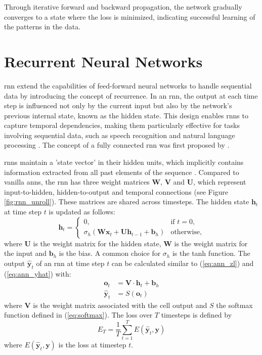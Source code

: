 \documentclass[12pt, a4paper, headinclude, twoside, plainheadsepline, open=right, numbers=noenddot, hidelinks, toc=listof, toc=bibliography]{scrreprt}
\begin{document}
Through iterative forward and backward propagation, the network gradually converges to a state where the loss is minimized, indicating successful learning of the patterns in the data.

\section{Recurrent Neural Networks}
\label{sec:rnn}

\Ac{rnn} extend the capabilities of feed-forward neural networks to handle sequential data by introducing the concept of recurrence. 
In an \ac{rnn}, the output at each time step is influenced not only by the current input but also by the network's previous internal state, known as the hidden state. 
This design enables \acp{rnn} to capture temporal dependencies, making them particularly effective for tasks involving sequential data, such as speech recognition and natural language processing \cite{lecunDeepLearning2015}.
The concept of a fully connected \ac{rnn} was first proposed by \citeauthor{elmanFindingStructureTime1990} \cite{elmanFindingStructureTime1990}.

\Acp{rnn} maintain a 'state vector' in their hidden units, which implicitly contains information extracted from all past elements of the sequence \cite{lecunDeepLearning2015}.
Compared to vanilla \acp{ann}, the \ac{rnn} has three weight matrices $\mathbf{W}$, $\mathbf{V}$ and $\mathbf{U}$, which represent input-to-hidden, hidden-to-output and temporal connections (see Figure \ref{fig:rnn_unroll}).
These matrices are shared across timesteps.
The hidden state $\mathbf{h}_t$ at time step $t$ is updated as follows:
\begin{equation}
\label{eq:rnn_update} 
\mathbf{h}_t =
\begin{cases}
	0, & \text{if } t = 0, \\
	\sigma_h (\mathbf{W} \mathbf{x}_t + \mathbf{U} \mathbf{h}_{t-1} + \mathbf{b}_h)
	& \text{otherwise},
\end{cases}
\end{equation}
where $\mathbf{U}$ is the weight matrix for the hidden state, $\mathbf{W}$ is the weight matrix for the input and $\mathbf{b}_h$ is the bias.
A common choice for $\sigma_h$ is the tanh function.
The output $\mathbf{\hat{y}}_t$ of an \ac{rnn} at time step $t$ can be calculated similar to (\ref{eq:ann_zl}) and (\ref{eq:ann_yhat}) with:
\begin{equation}
\label{eq:rnn_output}
\begin{split}
\mathbf{o}_t &= \mathbf{V} \cdot \mathbf{h}_t + \mathbf{b}_h \\
\mathbf{\hat{y}}_t &= S(\mathbf{o}_t)
\end{split}
\end{equation}
where $\mathbf{V}$ is the weight matrix associated with the cell output and $S$ the softmax function defined in (\ref{eq:softmax}). 
The loss over $T$ timesteps is defined by 
\begin{equation}
E_T = \frac{1}{T} \sum_{t=1}^{T} {E(\mathbf{\hat{y}}_t, \mathbf{y})}
\end{equation} 
where $E(\mathbf{\hat{y}}_t, \mathbf{y})$ is the loss at timestep $t$.
\end{document}

